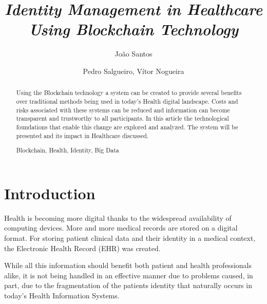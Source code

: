 \documentclass[]{llncs}
\begin{document}
\title{%
\textit{Identity Management in Healthcare Using Blockchain Technology}}

\author{%
João Santos \and
Pedro Salgueiro,
Vítor Nogueira}


{\def\addcontentsline#1#2#3{}\maketitle}



\begin{abstract}
Using the Blockchain technology a system can be created to provide several benefits 
over traditional methods being used in today's Health digital landscape. 
Costs and risks associated with these systems can be reduced and information can become 
transparent and trustworthy to all participants. In this article the technological foundations 
that enable this change are explored and analyzed. 
The system will be presented and its impact in Healthcare discussed.

	\begin{keywords}
  		Blockchain, Health, Identity, Big Data
	\end{keywords}
\end{abstract}


\section{Introduction}

Health is becoming more digital thanks to the widespread availability of computing devices.
More and more medical records are stored on a digital format. 
For storing patient clinical data and their identity in a medical context, 
the Electronic Health Record (EHR) was created.
 
While all this information should benefit both patient and health professionals alike, it is not being handled in an 
effective manner due to problems caused, in part, due to the fragmentation of the patients identity that 
naturally occurs in today's Health Information Systems.
\end{document}
